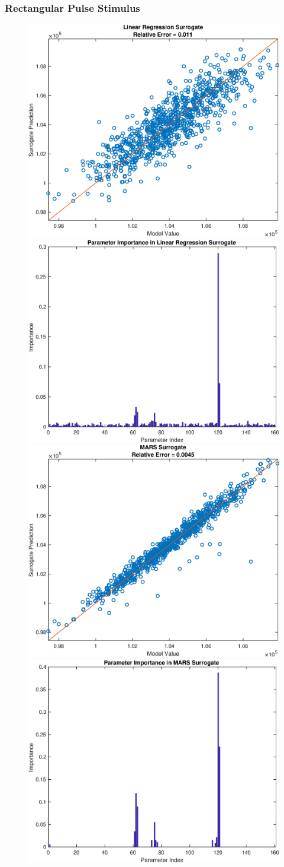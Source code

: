 \documentclass[12pt]{article}
\numberwithin{equation}{section}
\begin{document}
\subsubsection{Rectangular Pulse Stimulus}

\begin{figure}[h]
\centering
\includegraphics[width=.49 \textwidth]{Figures/K_AC_Mean_QoI_LR_Prediction_Rectangular.eps}
\includegraphics[width=.49 \textwidth]{Figures/K_AC_Mean_QoI_LR_VI_Rectangular.eps}\\
\includegraphics[width=.49 \textwidth]{Figures/K_AC_Mean_QoI_MARS_Prediction_Rectangular.eps}
\includegraphics[width=.49 \textwidth]{Figures/K_AC_Mean_QoI_MARS_VI_Rectangular.eps}
\end{figure}
\end{document}
